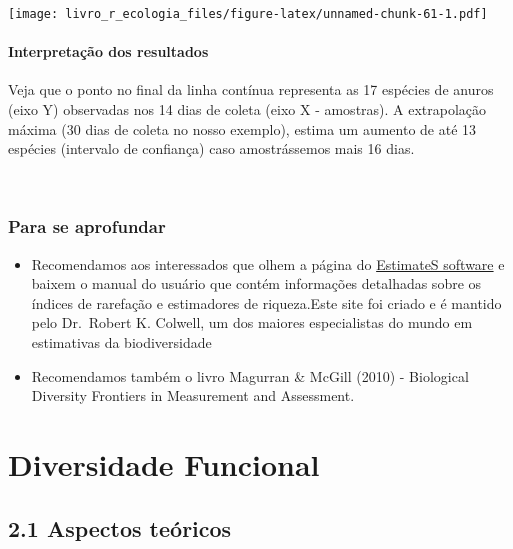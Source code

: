 \documentclass[
]{book}
\begin{document}
\texttt{[image: livro\_r\_ecologia\_files/figure-latex/unnamed-chunk-61-1.pdf]}

\hypertarget{interpretauxe7uxe3o-dos-resultados-7}{%
\subsubsection{Interpretação dos resultados}\label{interpretauxe7uxe3o-dos-resultados-7}}

Veja que o ponto no final da linha contínua representa as 17 espécies de anuros (eixo Y) observadas nos 14 dias de coleta (eixo X - amostras). A extrapolação máxima (30 dias de coleta no nosso exemplo), estima um aumento de até 13 espécies (intervalo de confiança) caso amostrássemos mais 16 dias.

~

\hypertarget{para-se-aprofundar}{%
\subsection{Para se aprofundar}\label{para-se-aprofundar}}

\begin{itemize}
\item
  Recomendamos aos interessados que olhem a página do \href{http://viceroy.eeb.uconn.edu/estimates}{EstimateS software} e baixem o manual do usuário que contém informações detalhadas sobre os índices de rarefação e estimadores de riqueza.Este site foi criado e é mantido pelo Dr.~Robert K. Colwell, um dos maiores especialistas do mundo em estimativas da biodiversidade
\item
  Recomendamos também o livro Magurran \& McGill (2010) - Biological Diversity Frontiers in Measurement and Assessment.
\end{itemize}

\hypertarget{diversidade-funcional}{%
\chapter{Diversidade Funcional}\label{diversidade-funcional}}

\hypertarget{aspectos-teuxf3ricos}{%
\section{2.1 Aspectos teóricos}\label{aspectos-teuxf3ricos}}
\end{document}
